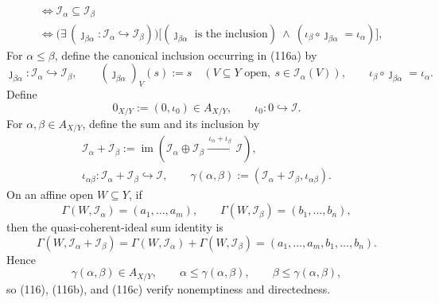\begin{definition}
\[\begin{aligned}
    &\Longleftrightarrow \mathcal I_\alpha\subseteq\mathcal I_\beta\\
    &\Longleftrightarrow
      \bigl(\exists\,(\jmath_{\beta\alpha}\colon
        \mathcal I_\alpha\hookrightarrow\mathcal I_\beta)\bigr)
      \bigl[
        (\jmath_{\beta\alpha}\text{ is the inclusion})
        \ \wedge\
        (\iota_\beta\circ\jmath_{\beta\alpha}=\iota_\alpha)
      \bigr],
  \end{aligned}                                                   \tag{116a}
  \]
  For $\alpha\leq\beta$, define the canonical inclusion occurring in
  (116a) by
  \[
    \jmath_{\beta\alpha}\colon
      \mathcal I_\alpha\hookrightarrow\mathcal I_\beta,
    \qquad
    (\jmath_{\beta\alpha})_V(s):=s
      \quad(V\subseteq Y\text{ open},\
        s\in\mathcal I_\alpha(V)),
    \qquad
    \iota_\beta\circ\jmath_{\beta\alpha}=\iota_\alpha.
  \]
  Define
  \[
    0_{X/Y}:=(0,\iota_0)\in A_{X/Y},
    \qquad
    \iota_0\colon0\hookrightarrow\mathcal I.
  \]
  For $\alpha,\beta\in A_{X/Y}$, define the sum and its inclusion by
  \[
  \begin{gathered}
    \mathcal I_\alpha+\mathcal I_\beta
      :=\operatorname{im}\!\left(
        \mathcal I_\alpha\oplus\mathcal I_\beta
          \xrightarrow{\,\iota_\alpha+\iota_\beta\,}\mathcal I\right),\\
    \iota_{\alpha\beta}\colon
      \mathcal I_\alpha+\mathcal I_\beta\hookrightarrow\mathcal I,
    \qquad
    \gamma(\alpha,\beta):=
      (\mathcal I_\alpha+\mathcal I_\beta,
        \iota_{\alpha\beta}).                                  
  \end{gathered} \tag{116b}
  \]
  On an affine open $W\subseteq Y$, if
  \[
    \Gamma(W,\mathcal I_\alpha)=(a_1,\ldots,a_m),
    \qquad
    \Gamma(W,\mathcal I_\beta)=(b_1,\ldots,b_n),
  \]
  then the quasi-coherent-ideal sum identity is
  \[
    \Gamma(W,\mathcal I_\alpha+\mathcal I_\beta)
      =\Gamma(W,\mathcal I_\alpha)+\Gamma(W,\mathcal I_\beta)
      =(a_1,\ldots,a_m,b_1,\ldots,b_n).
  \]
  Hence
  \[
    \gamma(\alpha,\beta)\in A_{X/Y},
    \qquad
    \alpha\leq\gamma(\alpha,\beta),
    \qquad
    \beta\leq\gamma(\alpha,\beta),                            \tag{116c}
  \]
  so (116), (116b), and (116c) verify nonemptiness and directedness.


\end{definition}
